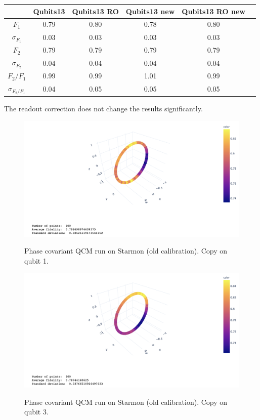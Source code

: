 \documentclass[11pt]{article}
\begin{document}
\begin{table}[H]
    \centering
    \begin{tabular}{|c|c|c|c|c|c|}
    \hline
    \textbf{} & \textbf{Qubits13} & \textbf{Qubits13 RO} & \textbf{Qubits13 new} & \textbf{Qubits13 RO new} \\ \hline
    $F_1$              & 0.79 & 0.80 & 0.78 & 0.80 \\ \hline
    $\sigma_{F_1}$     & 0.03 & 0.03 & 0.03 & 0.03 \\ \hline
    $F_2$              & 0.79 & 0.79 & 0.79 & 0.79 \\ \hline
    $\sigma_{F_2}$     & 0.04 & 0.04 & 0.04 & 0.04 \\ \hline
    $F_2/F_1$          & 0.99 & 0.99 & 1.01 & 0.99 \\ \hline
    $\sigma_{F_2/F_1}$ & 0.04 & 0.05 & 0.05 & 0.05 \\ \hline
    \end{tabular}
\end{table}
The readout correction does not change the results significantly.

\begin{figure}[H]
    \centering
            \includegraphics[totalheight=6cm]{Figures/starmon13qubit1oldcalib.png}
        \label{fig:oldcalib1}
        \caption{Phase covariant QCM run on Starmon (old calibration). Copy on qubit 1.}
\end{figure}
\begin{figure}[H]
    \centering
            \includegraphics[totalheight=6cm]{Figures/starmon13qubit3oldcalib.png}
        \label{fig:oldcalib2}
        \caption{Phase covariant QCM run on Starmon (old calibration). Copy on qubit 3.}
\end{figure}
\end{document}
